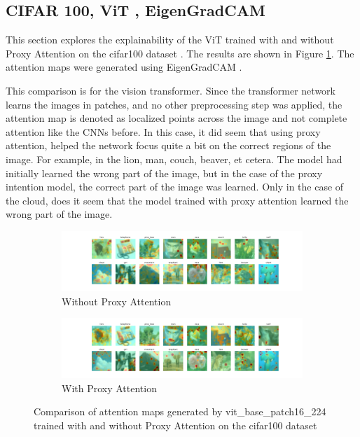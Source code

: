 \subsection{CIFAR 100, ViT , EigenGradCAM}
This section explores the explainability of the ViT \cite{dosovitskiyImageWorth16x162021} trained with and without Proxy Attention on the cifar100 dataset \cite{krizhevskyLearningMultipleLayers}. The results are shown in Figure \ref{fig:vit_cifar100}. The attention maps were generated using EigenGradCAM \cite{banymuhammadEigenCAMVisualExplanations2021}.

This comparison is for the vision transformer. Since the transformer network learns the images in patches, and no other preprocessing step was applied, the attention map is denoted as localized points across the image and not complete attention like the CNNs before. In this case, it did seem that using proxy attention, helped the network focus quite a bit on the correct regions of the image. For example, in the lion, man, couch, beaver, et cetera. The model had initially learned the wrong part of the image, but in the case of the proxy intention model, the correct part of the image was learned. Only in the case of the cloud, does it seem that the model trained with proxy attention learned the wrong part of the image.

    \begin{figure}[!htb]
        \begin{subfigure}[b]{1\textwidth}
            \includegraphics[width=\linewidth]{images/gpp_cifar100_vit_base_patch16_224_noproxy_0.pdf}
            \caption{Without Proxy Attention}
        \end{subfigure}
        \begin{subfigure}[b]{1\textwidth}
            \includegraphics[width=\linewidth]{images/gpp_cifar100_vit_base_patch16_224_proxy_0.pdf}
            \caption{With Proxy Attention}
        \end{subfigure}
        \caption{Comparison of attention maps generated by vit\_base\_patch16\_224 trained with and without Proxy Attention on the cifar100 dataset}
        \label{fig:vit_cifar100}
    \end{figure}
    



